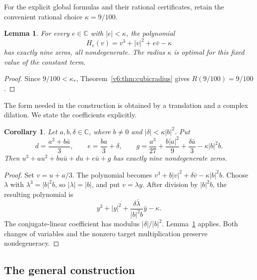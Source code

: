 \documentclass[UTF8,11pt]{ctexart}
\newtheorem{lem}[thm]{Lemma}
\newtheorem{cor}[thm]{Corollary}
\theoremstyle{definition}
\numberwithin{equation}{section}
\newcommand{\C}{\mathbb C}\newcommand{\R}{\mathbb R}
\begin{document}
For the explicit global formulas and their rational certificates, retain
the convenient rational choice $\kappa=9/100$.
\begin{lem}\label{c:lem:cubic}
For every $e\in\C$ with $|e|<\kappa$, the polynomial
\[
 H_e(v)=v^3+|v|^2+e\bar v-\kappa
\]
has exactly nine zeros, all nondegenerate. The radius $\kappa$ is optimal
for this fixed value of the constant term.
\end{lem}
\begin{proof}
Since $9/100<\kappa_*$, Theorem~\ref{v6:thm:cubicradius}
gives $R(9/100)=9/100$.
\end{proof}

The form needed in the construction is obtained by a translation and
a complex dilation. We state the coefficients explicitly.
\begin{cor}\label{c:cor:local}
Let $a,b,\delta\in\C$, where $b\ne0$ and
$|\delta|<\kappa|b|^2$. Put
\begin{equation}\label{c:eq:localcoefficients}
 d=\frac{a^2+b\bar a}{3},\qquad
 e=\frac{ba}{3}+\delta,\qquad
 g=\frac{a^3}{27}+\frac{b|a|^2}{9}
       +\frac{\delta\bar a}{3}-\kappa|b|^2b.
\end{equation}
Then $u^3+au^2+bu\bar u+du+e\bar u+g$ has exactly nine
nondegenerate zeros.
\end{cor}
\begin{proof}
Set $v=u+a/3$. The polynomial becomes
$v^3+b|v|^2+\delta\bar v-\kappa|b|^2b$.
Choose $\lambda$ with $\lambda^3=|b|^2b$, so $|\lambda|=|b|$,
and put $v=\lambda y$. After division by $|b|^2b$, the resulting
polynomial is
\[
 y^3+|y|^2+\frac{\delta\bar\lambda}{|b|^2b}\bar y-\kappa.
\]
The conjugate-linear coefficient has modulus $|\delta|/|b|^2$.
Lemma~\ref{c:lem:cubic} applies. Both changes of variables and the
nonzero target multiplication preserve nondegeneracy.
\end{proof}

\subsection{The general construction}\label{c:sec:family}
\end{document}
